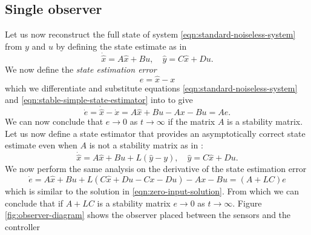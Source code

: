 \subsection{Single observer}
Let us now reconstruct the full state of system \eqref{eqn:standard-noiseless-system} from  $y$ and $u$ by defining the state estimate as in \cite[Section 16.5]{Hespanha2018LinearTheory}
\begin{equation}\label{eqn:stable-simple-state-estimator}
    \dot{\hat{x}} = A\hat{x} + Bu, \quad \hat{y} = C\hat{x} + Du.
\end{equation}
We now define the \textit{state estimation error}
\begin{equation}\label{eqn:estimate-error}
    e = \hat{x} - x
\end{equation}
which we differentiate and substitute equations \eqref{eqn:standard-noiseless-system} and \eqref{eqn:stable-simple-state-estimator} into to give
\begin{equation*}
    \dot{e} = \dot{\hat{x}} - \dot{x} = A\hat{x} + Bu - Ax - Bu = Ae.
\end{equation*}
We can now conclude that $e \rightarrow 0$ as $t \rightarrow \infty$ if the matrix $A$ is a stability matrix. Let us now define a state estimator that provides an asymptotically correct state estimate even when $A$ is not a stability matrix as in \cite[Section 16.5]{Hespanha2018LinearTheory}:
\begin{equation}\label{eqn:unstable-simple-state-estimator}
    \dot{\hat{x}} = A\hat{x} + Bu + L(\hat{y} - y), \quad \hat{y} = C\hat{x} + Du.
\end{equation}
We now perform the same analysis on the derivative of the state estimation error
\begin{equation}\label{eqn:error-linear-observer}
    \dot{e} = A\hat{x} + Bu + L(C\hat{x} + Du - Cx - Du) - Ax - Bu = (A+LC)e
\end{equation}
which is similar to the solution in \eqref{eqn:zero-input-solution}. From which we can conclude that if $A+LC$ is a stability matrix $e \rightarrow 0$ as $t \rightarrow \infty$. Figure \ref{fig:observer-diagram} shows the observer placed between the sensors and the controller

